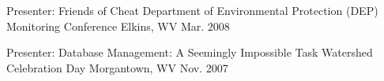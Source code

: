 \begin{cventries}

\cventry
{Presenter: Friends of Cheat} %
{Department of Environmental Protection (DEP) Monitoring Conference} %
{Elkins, WV} %
{Mar. 2008} %
{ %
\begin{cvitems}
\end{cvitems}
}
\vspace{-5mm}


\cventry
{Presenter: Database Management: A Seemingly Impossible Task} %
{Watershed Celebration Day} %
{Morgantown, WV} %
{Nov. 2007} %
{ %
\begin{cvitems}
\end{cvitems}
}
\vspace{-5mm}

\end{cventries}